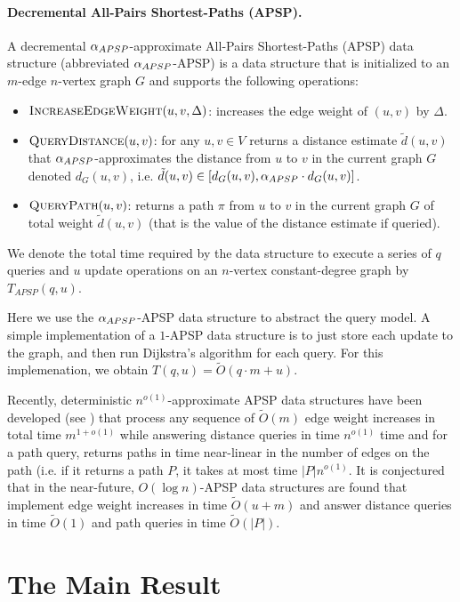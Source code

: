 \paragraph{Decremental All-Pairs Shortest-Paths (APSP).} 
A decremental $\alpha_{APSP}$-approximate All-Pairs Shortest-Paths (APSP) data structure (abbreviated $\alpha_{APSP}$-APSP) is a data structure that is initialized to an $m$-edge $n$-vertex graph $G$ and supports the following operations:
\begin{itemize}
    \item $\textsc{IncreaseEdgeWeight}(u,v, \Delta)$: increases the edge weight of $(u,v)$ by $\Delta$. 
    \item $\textsc{QueryDistance}(u,v)$: for any $u,v \in V$ returns a distance estimate $\tilde{d}(u,v)$ that $\alpha_{APSP}$-approximates the distance from $u$ to $v$ in the current graph $G$ denoted $d_G(u,v)$, i.e. $\tilde{d}(u,v) \in [d_G(u,v), \alpha_{APSP} \cdot d_G(u,v)]$.
    \item $\textsc{QueryPath}(u,v)$: returns a path $\pi$ from $u$ to $v$ in the current graph $G$ of total weight $\tilde{d}(u,v)$ (that is the value of the distance estimate if queried).
\end{itemize}
We denote the total time required by the data structure to execute a series of $q$ queries and $u$ update operations on an $n$-vertex constant-degree graph by $T_{APSP}(q,u)$.

Here we use the $\alpha_{APSP}$-APSP data structure to abstract the query model. A simple implementation of a $1$-APSP data structure is to just store each update to the graph, and then run Dijkstra's algorithm for each query. For this implemenation, we obtain $T(q,u) = \tilde{O}(q \cdot m + u)$. 

Recently, deterministic $n^{o(1)}$-approximate APSP data structures have been developed (see \cite{chuzhoy2021decremental,bernstein2022deterministic}) that process any sequence of $\tilde{O}(m)$ edge weight increases in total time $m^{1+o(1)}$ while answering distance queries in time $n^{o(1)}$ time and for a path query, returns paths in time near-linear in the number of edges on the path (i.e. if it returns a path $P$, it takes at most time $|P|n^{o(1)}$. It is conjectured that in the near-future, $O(\log n)$-APSP data structures are found that implement edge weight increases in time $\tilde{O}(u + m)$ and answer distance queries in time $\tilde{O}(1)$ and path queries in time $\tilde{O}(|P|)$. 

\section{The Main Result}

